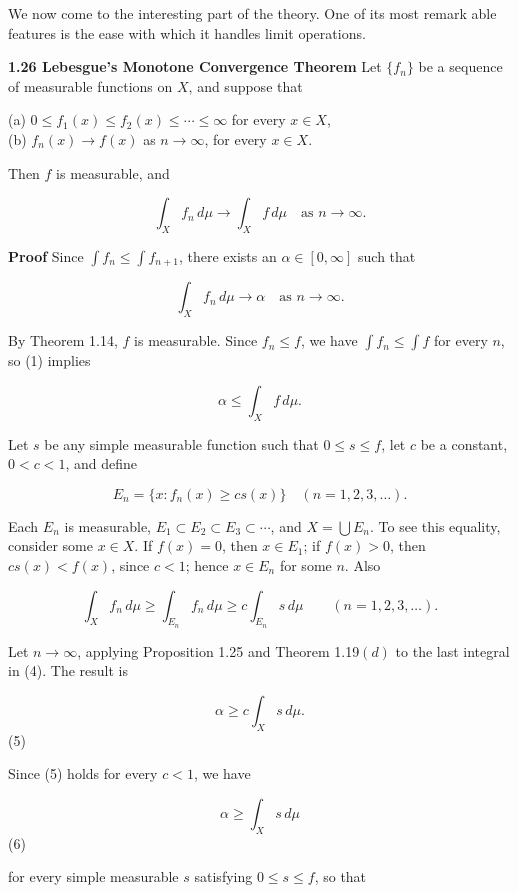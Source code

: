 \documentclass[11pt]{article}
\begin{document}
We now come to the interesting part of the theory. One of its most remark able features is the ease with which it handles limit operations.

\label{org4d6666f}
\textbf{\textbf{1.26 Lebesgue's Monotone Convergence Theorem}} Let \(\{f_n\}\) be a sequence of measurable functions on \(X\), and suppose that

(a) \(0 \leq f_1(x) \leq f_2(x) \leq \cdots \leq \infty\) for every \(x \in X\), \\
(b) \(f_n(x) \to f(x)\) as \(n \to \infty\), for every \(x \in X\).

Then \(f\) is measurable, and

\[
\int_X f_n \, d\mu \to \int_X f \, d\mu \quad \text{as } n \to \infty.
\]

\textbf{\textbf{Proof}} Since \(\int f_n \leq \int f_{n+1}\), there exists an \(\alpha \in [0, \infty]\) such that

\[
\int_X f_n \, d\mu \to \alpha \quad \text{as } n \to \infty.\tag{1}
\]


By Theorem 1.14, \(f\) is measurable. Since \(f_n \leq f\), we have \(\int f_n \leq \int f\) for every \(n\), so (1) implies

\[
\alpha \leq \int_X f \, d\mu.\tag{2}
\]

Let \(s\) be any simple measurable function such that \(0 \leq s \leq f\), let \(c\) be a constant, \(0 < c < 1\), and define

\[
E_n = \{x: f_n(x) \geq cs(x)\} \quad (n = 1, 2, 3, \ldots).\tag{3}
\]

Each \(E_{n}\) is measurable, \(E_{1} \subset E_{2} \subset E_{3} \subset \cdots\), and \(X = \bigcup E_{n}\). To see this equality, consider some \(x \in X\). If \(f(x) = 0\), then \(x \in E_{1}\); if \(f(x) > 0\), then \(cs(x) < f(x)\), since \(c < 1\); hence \(x \in E_{n}\) for some \(n\). Also

\[
\int_{X} f_{n} \, d\mu \geq \int_{E_{n}} f_{n} \, d\mu \geq c \int_{E_{n}} s \, d\mu \qquad (n = 1, 2, 3, \ldots).\tag{4}
\]

Let \(n \rightarrow \infty\), applying Proposition 1.25 and Theorem 1.19\((d)\) to the last integral in (4). The result is

\[
\alpha \geq c \int_{X} s \, d\mu.
\](5)

Since (5) holds for every \(c < 1\), we have

\[
\alpha \geq \int_{X} s \, d\mu
\](6)

for every simple measurable \(s\) satisfying \(0 \leq s \leq f\), so that
\end{document}

